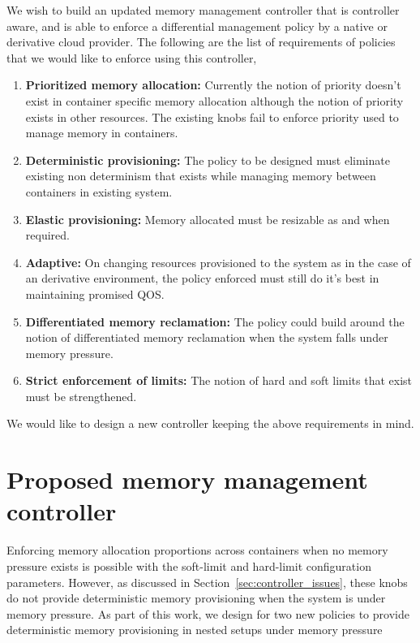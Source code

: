     We wish to build an updated memory management controller that is controller aware, and is able to enforce a differential management
    policy by a native or derivative cloud provider. The following are the list of requirements of policies that we would like to enforce
    using this controller,
  
    \begin{enumerate}
      \item \textbf{Prioritized memory allocation:} Currently the notion of priority doesn't exist in container specific memory allocation 
although the notion of priority exists in other resources. The existing knobs fail to enforce priority used to manage memory in containers. 
      \item \textbf{Deterministic provisioning:} The policy to be designed must eliminate existing non determinism that exists while 
managing memory between containers in existing system.
      \item \textbf{Elastic provisioning:} Memory allocated must be resizable as and when required. 
      \item \textbf{Adaptive:} On changing resources provisioned to the system as in the case of an derivative environment, the policy 
enforced must still do it's best in maintaining promised QOS.
      \item \textbf{Differentiated memory reclamation:} The policy could build around the notion of differentiated memory reclamation when 
the system falls under memory pressure.
      \item \textbf{Strict enforcement of limits:} The notion of hard and soft limits that exist must be strengthened.      
    \end{enumerate}
    
  We would like to design a new controller keeping the above requirements in mind.
   
  
  \section{Proposed memory management controller}
      
      Enforcing memory allocation proportions across containers when no memory pressure exists is possible with the soft-limit and hard-limit 
      configuration parameters. However, as discussed in Section~\ref{sec:controller_issues}, these knobs do not provide deterministic memory 
      provisioning when the system is under memory pressure. As part of this work, we design for two new policies to provide deterministic 
      memory provisioning in nested setups under memory pressure
      
